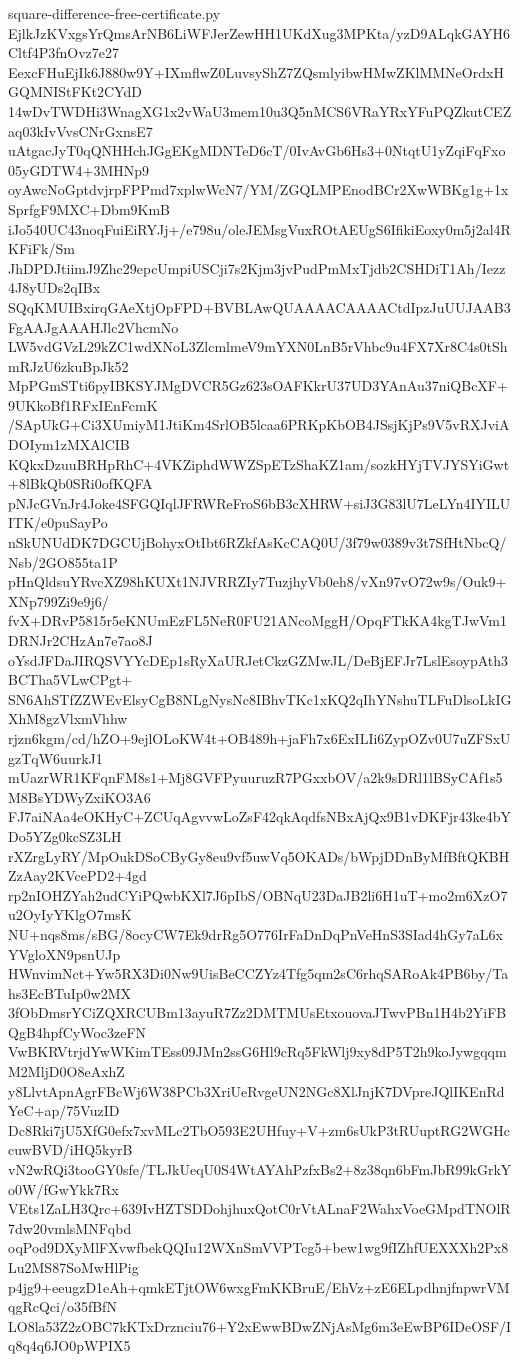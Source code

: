 \documentclass[11pt]{article}
\theoremstyle{definition}
\theoremstyle{remark}
\begin{document}
\begin{filecontents*}[overwrite]{square-difference-free-certificate.py}
EjlkJzKVxgsYrQmsArNB6LiWFJerZewHH1UKdXug3MPKta/yzD9ALqkGAYH6Cltf4P3fnOvz7e27
EexcFHuEjIk6J880w9Y+IXmflwZ0LuvsyShZ7ZQsmlyibwHMwZKlMMNeOrdxHGQMNIStFKt2CYdD
14wDvTWDHi3WnagXG1x2vWaU3mem10u3Q5nMCS6VRaYRxYFuPQZkutCEZaq03kIvVvsCNrGxnsE7
uAtgacJyT0qQNHHchJGgEKgMDNTeD6cT/0IvAvGb6Hs3+0NtqtU1yZqiFqFxo05yGDTW4+3MHNp9
oyAwcNoGptdvjrpFPPmd7xplwWcN7/YM/ZGQLMPEnodBCr2XwWBKg1g+1xSprfgF9MXC+Dbm9KmB
iJo540UC43noqFuiEiRYJj+/e798u/oleJEMsgVuxROtAEUgS6IfikiEoxy0m5j2al4RKFiFk/Sm
JhDPDJtiimJ9Zhc29epcUmpiUSCji7s2Kjm3jvPudPmMxTjdb2CSHDiT1Ah/Iezz4J8yUDs2qIBx
SQqKMUIBxirqGAeXtjOpFPD+BVBLAwQUAAAACAAAACtdIpzJuUUJAAB3FgAAJgAAAHJlc2VhcmNo
LW5vdGVzL29kZC1wdXNoL3ZlcmlmeV9mYXN0LnB5rVhbc9u4FX7Xr8C4s0tShmRJzU6zkuBpJk52
MpPGmSTti6pyIBKSYJMgDVCR5Gz623sOAFKkrU37UD3YAnAu37niQBcXF+9UKkoBf1RFxIEnFcmK
/SApUkG+Ci3XUmiyM1JtiKm4SrlOB5lcaa6PRKpKbOB4JSsjKjPs9V5vRXJviADOIym1zMXAlCIB
KQkxDzuuBRHpRhC+4VKZiphdWWZSpETzShaKZ1am/sozkHYjTVJYSYiGwt+8lBkQb0SRi0ofKQFA
pNJcGVnJr4Joke4SFGQIqlJFRWReFroS6bB3cXHRW+siJ3G83lU7LeLYn4IYILUITK/e0puSayPo
nSkUNUdDK7DGCUjBohyxOtIbt6RZkfAsKcCAQ0U/3f79w0389v3t7SfHtNbcQ/Nsb/2GO855ta1P
pHnQldsuYRvcXZ98hKUXt1NJVRRZIy7TuzjhyVb0eh8/vXn97vO72w9s/Ouk9+XNp799Zi9e9j6/
fvX+DRvP5815r5eKNUmEzFL5NeR0FU21ANcoMggH/OpqFTkKA4kgTJwVm1DRNJr2CHzAn7e7ao8J
oYsdJFDaJIRQSVYYcDEp1sRyXaURJetCkzGZMwJL/DeBjEFJr7LslEsoypAth3BCTha5VLwCPgt+
SN6AhSTfZZWEvElsyCgB8NLgNysNc8IBhvTKc1xKQ2qIhYNshuTLFuDlsoLkIGXhM8gzVlxmVhhw
rjzn6kgm/cd/hZO+9ejlOLoKW4t+OB489h+jaFh7x6ExILIi6ZypOZv0U7uZFSxUgzTqW6uurkJ1
mUazrWR1KFqnFM8s1+Mj8GVFPyuuruzR7PGxxbOV/a2k9sDRl1lBSyCAf1s5M8BsYDWyZxiKO3A6
FJ7aiNAa4eOKHyC+ZCUqAgvvwLoZsF42qkAqdfsNBxAjQx9B1vDKFjr43ke4bYDo5YZg0kcSZ3LH
rXZrgLyRY/MpOukDSoCByGy8eu9vf5uwVq5OKADs/bWpjDDnByMfBftQKBHZzAay2KVcePD2+4gd
rp2nIOHZYah2udCYiPQwbKXl7J6pIbS/OBNqU23DaJB2li6H1uT+mo2m6XzO7u2OyIyYKlgO7msK
NU+nqs8ms/sBG/8ocyCW7Ek9drRg5O776IrFaDnDqPnVeHnS3SIad4hGy7aL6xYVgloXN9psnUJp
HWnvimNct+Yw5RX3Di0Nw9UisBeCCZYz4Tfg5qm2sC6rhqSARoAk4PB6by/Tahs3EcBTuIp0w2MX
3fObDmsrYCiZQXRCUBm13ayuR7Zz2DMTMUsEtxouovaJTwvPBn1H4b2YiFBQgB4hpfCyWoc3zeFN
VwBKRVtrjdYwWKimTEss09JMn2ssG6Hl9cRq5FkWlj9xy8dP5T2h9koJywgqqmM2MljD0O8eAxhZ
y8LlvtApnAgrFBcWj6W38PCb3XriUeRvgeUN2NGc8XlJnjK7DVpreJQlIKEnRdYeC+ap/75VuzID
Dc8Rki7jU5XfG0efx7xvMLc2TbO593E2UHfuy+V+zm6sUkP3tRUuptRG2WGHccuwBVD/iHQ5kyrB
vN2wRQi3tooGY0sfe/TLJkUeqU0S4WtAYAhPzfxBs2+8z38qn6bFmJbR99kGrkYo0W/fGwYkk7Rx
VEts1ZaLH3Qrc+639IvHZTSDDohjhuxQotC0rVtALnaF2WahxVoeGMpdTNOlR7dw20vmlsMNFqbd
oqPod9DXyMlFXvwfbekQQIu12WXnSmVVPTcg5+bew1wg9fIZhfUEXXXh2Px8Lu2MS87SoMwHlPig
p4jg9+eeugzD1eAh+qmkETjtOW6wxgFmKKBruE/EhVz+zE6ELpdhnjfnpwrVMqgRcQci/o35fBfN
LO8la53Z2zOBC7kKTxDrznciu76+Y2xEwwBDwZNjAsMg6m3eEwBP6IDeOSF/Iq8q4q6JO0pWPIX5

\end{filecontents*}
\end{document}
